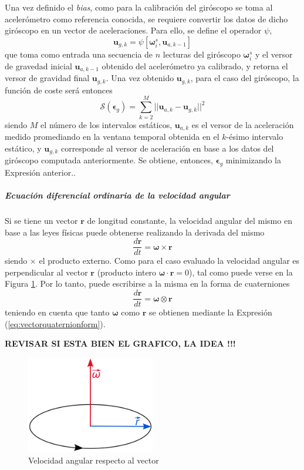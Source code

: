 Una vez definido el \textit{bias}, como para la calibración del giróscopo se toma al acelerómetro como referencia conocida, se requiere convertir los datos de dicho giróscopo en un vector de aceleraciones. Para ello, se define el operador $\psi$, 
\begin{equation}
    \bm{u}_{g,k} = \psi\left[\bm{\omega}_i^s,\bm{u}_{a,k-1}\right]
\end{equation}
que toma como entrada una secuencia de $n$ lecturas del giróscopo $\bm{\omega}_i^s$ y el versor de gravedad inicial $\bm{u}_{a,k-1}$ obtenido del acelerómetro ya calibrado, y retorna el versor de gravidad final $\bm{u}_{g,k}$. 
Una vez obtenido $\bm{u}_{g,k}$, para el caso del giróscopo, la función de coste será entonces
\begin{equation}
    \mathscr{S}(\bm{\epsilon}_{g}) = \sum_{k=2}^M ||\bm{u}_{a,k} - \bm{u}_{g,k}||^2
\end{equation}
siendo $M$ el número de los intervalos estáticos, $\bm{u}_{a,k}$ es el versor de la aceleración medido promediando en la ventana temporal obtenida en el $k$-ésimo intervalo estático, y $\bm{u}_{g,k}$ corresponde al versor de aceleración en base a los datos del giróscopo computada anteriormente. Se obtiene, entonces, $\bm{\epsilon}_{g}$ minimizando la Expresión anterior..

\subparagraph{Ecuación diferencial ordinaria de la velocidad angular}
Si se tiene un vector $\bm{r}$ de longitud constante, la velocidad angular del mismo en base a las leyes físicas puede obtenerse realizando la derivada del mismo
\begin{equation}
    \frac{d\bm{r}}{dt} = \bm{\omega}\times \bm{r}
\end{equation}
siendo $\times$ el producto externo. Como para el caso evaluado la velocidad angular es perpendicular al vector $\bm{r}$ (producto intero $\bm{\omega}\cdot\bm{r} = 0$), tal como puede verse en la Figura \ref{fig:angularvelocity}. Por lo tanto, puede escribirse a la misma en la forma de cuaterniones
\begin{equation}
    \frac{d\bm{r}}{dt} = \bm{\omega} \otimes \bm{r}
\end{equation}
teniendo en cuenta que tanto $\bm{\omega}$ como $\bm{r}$ se obtienen mediante la Expresión (\ref{eq:vectorquaternionform}).

\textbf{REVISAR SI ESTA BIEN EL GRAFICO, LA IDEA !!!}
\begin{figure}[!ht]
    \centering
    \includegraphics[width=0.5\textwidth]{Img/AngularVelocity.png}
    \caption{Velocidad angular respecto al vector}
    \label{fig:angularvelocity}
\end{figure}

